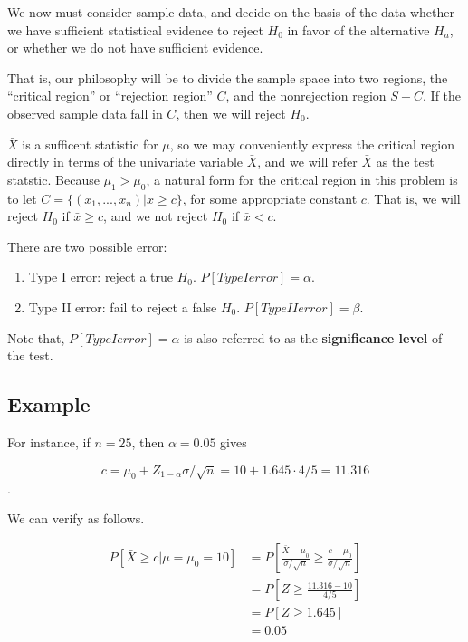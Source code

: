 \documentclass[]{book}
\begin{document}
We now must consider sample data, and decide on the basis of the data whether we have sufficient statistical evidence to reject \(H_0\) in favor of the alternative \(H_a\), or whether we do not have sufficient evidence.

That is, our philosophy will be to divide the sample space into two regions, the ``critical region'' or ``rejection region'' \(C\), and the nonrejection region \(S-C\). If the observed sample data fall in \(C\), then we will reject \(H_0\).

\(\bar{X}\) is a sufficent statistic for \(\mu\), so we may conveniently express the critical region directly in terms of the univariate variable \(\bar{X}\), and we will refer \(\bar{X}\) as the test statstic. Because \(\mu_1 > \mu_0\), a natural form for the critical region in this problem is to let \(C=\{ (x_1,..., x_n) | \bar{x} \geq c\}\), for some appropriate constant \(c\). That is, we will reject \(H_0\) if \(\bar{x} \geq c\), and we not reject \(H_0\) if \(\bar{x} < c\).

There are two possible error:

\begin{enumerate}
\def\labelenumi{\arabic{enumi}.}
\item
  Type I error: reject a true \(H_0\). \(P[Type I error]=\alpha\).
\item
  Type II error: fail to reject a false \(H_0\). \(P[Type II error]=\beta\).
\end{enumerate}

Note that, \(P[Type I error]=\alpha\) is also referred to as the \textbf{significance level} of the test.

\hypertarget{example}{%
\subsection{Example}\label{example}}

For instance, if \(n=25\), then \(\alpha=0.05\) gives

\[c=\mu_0+Z_{1-\alpha}\sigma/\sqrt{n}=10+1.645 \cdot 4/5=11.316\].

We can verify as follows.

\[\begin{aligned} P[\bar{X}\geq c | \mu=\mu_0=10] &=P[\frac{\bar{X}-\mu_0}{\sigma/\sqrt{n}} \geq \frac{c-\mu_0}{\sigma/\sqrt{n}}] \\ &=P[Z \geq \frac{11.316-10}{4/5}] \\&=P[Z\geq 1.645] \\&=0.05 \end{aligned}\]
\end{document}
